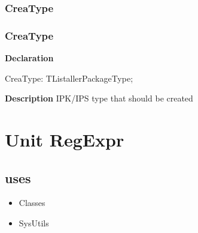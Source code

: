 \documentclass{report}
\newif\ifpdf
\begin{document}
\subsection*{\large{\textbf{CreaType}}\normalsize\hspace{1ex}\hrulefill}
\else
\subsection*{CreaType}
\fi
\label{prjwizard-CreaType}
\begin{list}{}{
\setlength{\itemindent}{0cm}
\setlength{\listparindent}{0cm}
\setlength{\leftmargin}{\evensidemargin}
\addtolength{\leftmargin}{\tmplength}
\settowidth{\labelsep}{X}
\addtolength{\leftmargin}{\labelsep}
\setlength{\labelwidth}{\tmplength}
}
\item[\textbf{Declaration}\hfill]
\ifpdf
\begin{flushleft}
\fi
\begin{ttfamily}
CreaType: TListallerPackageType;\end{ttfamily}

\ifpdf
\end{flushleft}
\fi

\par
\item[\textbf{Description}]
IPK/IPS type that should be created

\end{list}
\chapter{Unit RegExpr}
\label{RegExpr}
\section{uses}
\begin{itemize}
\item \begin{ttfamily}Classes\end{ttfamily}\item \begin{ttfamily}SysUtils\end{ttfamily}\end{itemize}
\end{document}

